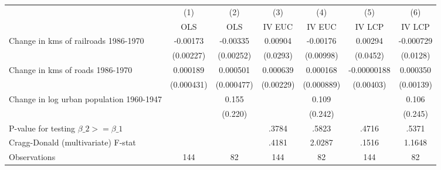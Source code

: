 {
\def\sym#1{\ifmmode^{#1}\else\(^{#1}\)\fi}
\begin{tabular}{l*{6}{c}}
\hline\hline
                &\multicolumn{1}{c}{(1)}&\multicolumn{1}{c}{(2)}&\multicolumn{1}{c}{(3)}&\multicolumn{1}{c}{(4)}&\multicolumn{1}{c}{(5)}&\multicolumn{1}{c}{(6)}\\
                &\multicolumn{1}{c}{OLS}&\multicolumn{1}{c}{OLS}&\multicolumn{1}{c}{IV EUC}&\multicolumn{1}{c}{IV EUC}&\multicolumn{1}{c}{IV LCP}&\multicolumn{1}{c}{IV LCP}\\
\hline
Change in kms of railroads 1986-1970& -0.00173         & -0.00335         &  0.00904         & -0.00176         &  0.00294         &-0.000729         \\
                &(0.00227)         &(0.00252)         & (0.0293)         &(0.00998)         & (0.0452)         & (0.0128)         \\
[1em]
Change in kms of roads 1986-1970& 0.000189         & 0.000501         & 0.000639         & 0.000168         &-0.00000188         & 0.000350         \\
                &(0.000431)         &(0.000477)         &(0.00229)         &(0.000889)         &(0.00403)         &(0.00139)         \\
[1em]
Change in log urban population 1960-1947&                  &    0.155         &                  &    0.109         &                  &    0.106         \\
                &                  &  (0.220)         &                  &  (0.242)         &                  &  (0.245)         \\
\hline
P-value for testing $\beta\_{2} >= \beta\_{1}$&                  &                  &    .3784         &    .5823         &    .4716         &    .5371         \\
Cragg-Donald (multivariate) F-stat&                  &                  &    .4181         &   2.0287         &    .1516         &   1.1648         \\
Observations    &      144         &       82         &      144         &       82         &      144         &       82         \\
\hline\hline
\end{tabular}
}
